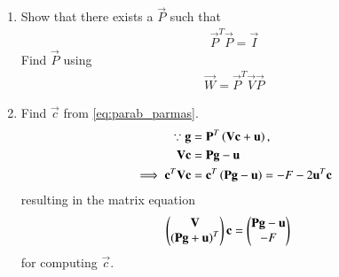 \documentclass[journal,12pt,twocolumn]{IEEEtran}
\renewcommand\thesection{\arabic{section}}
\begin{document}
\begin{enumerate}[label=\thesection.\arabic*
,ref=\thesection.\theenumi]
\solution Substituting \eqref{eq:parab_affine} in \eqref{eq:parab_gen},
\begin{align}
\brak{\vec{P}\vec{y}+\vec{c}}^T\vec{V}\brak{\vec{P}\vec{y}+\vec{c}}+2\vec{u}^T\brak{\vec{P}\vec{y}+\vec{c}}+ F = 0, 
\end{align}
which can be expressed as
\begin{multline}
\implies \vec{y}^T\vec{P}^T\vec{V}\vec{P}\vec{y}+2\brak{\vec{V}\vec{c}+\vec{u}}^T\vec{P}\vec{y}
\\
+ F+ \vec{c}^T\vec{V}\vec{c} + 2\vec{u}^T\vec{c} = 0
\label{eq:parab_simp}
\end{multline}
%
Comparing \eqref{eq:parab_simp} with \eqref{eq:parab_mat} \eqref{eq:parab_parmas} is obtained.
%
\item Show that there exists a $\vec{P}$ such that 
\begin{align}
\vec{P}^T\vec{P} = \vec{I}
\end{align}
%
Find $\vec{P}$ using
\begin{align}
\vec{W} = \vec{P}^T\vec{V}\vec{P}
\end{align}
\item Find $\vec{c}$ from \eqref{eq:parab_parmas}.
\\
\solution 
\begin{align}
\because \mathbf{g} &= \mathbf{P}^T\left(\mathbf{V}\mathbf{c}+\mathbf{u}\right),
\\
\mathbf{V}\mathbf{c}&= \mathbf{P}\mathbf{g} - \mathbf{u}
\\
\implies \mathbf{c}^T\mathbf{V}\mathbf{c} &= \mathbf{c}^T\left(\mathbf{P}\mathbf{g} - \mathbf{u}\right) = -F- 2\mathbf{u}^T\mathbf{c}
\end{align}
%
resulting in the matrix equation
\begin{align}
\begin{pmatrix}\mathbf{V}\\ \left(\mathbf{P}\mathbf{g} + \mathbf{u}\right)^T\end{pmatrix}\mathbf{c}&= \begin{pmatrix}\mathbf{P}\mathbf{g} - \mathbf{u}\\ -F\end{pmatrix}
\end{align}
%
for computing $\vec{c}$.
\end{enumerate}
\end{document}
